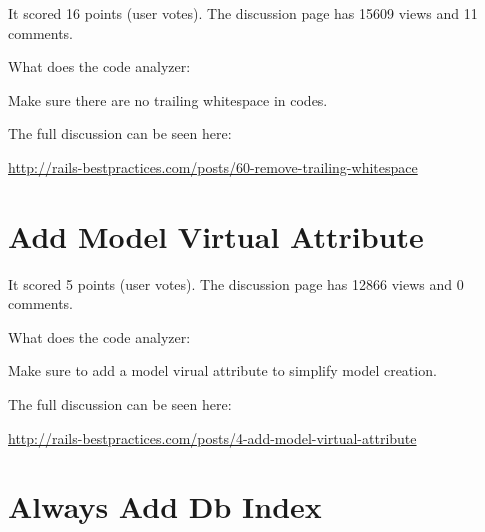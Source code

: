 It scored 16 points (user votes). 
The discussion page has 15609 views and 11 comments.

What does the code analyzer:

Make sure there are no trailing whitespace in codes.

The full discussion can be seen here:

\url{http://rails-bestpractices.com/posts/60-remove-trailing-whitespace}
   
\section{Add Model Virtual Attribute}
 

It scored 5 points (user votes). 
The discussion page has 12866 views and 0 comments.

What does the code analyzer:

Make sure to add a model virual attribute to simplify model creation.

The full discussion can be seen here:

\url{http://rails-bestpractices.com/posts/4-add-model-virtual-attribute}

       
\section{Always Add Db Index}
  

